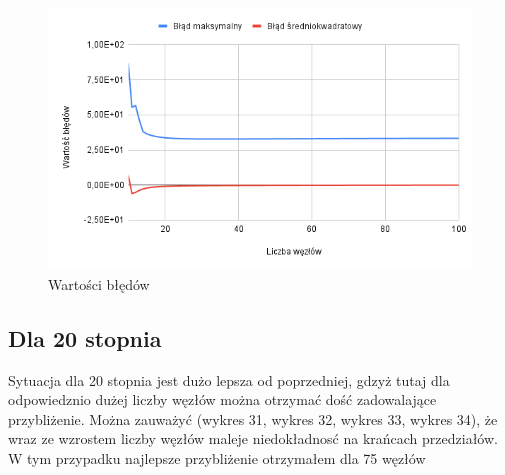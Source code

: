 \documentclass{article}
\begin{document}
\begin{figure}[H]
  \centering
  \begin{minipage}[b]{0.4\textwidth}
    \includegraphics[width=\textwidth]{img32.png}
    \caption{Wartości błędów}
  \end{minipage}
\end{figure}

\subsection{Dla 20 stopnia}

Sytuacja dla 20 stopnia jest dużo lepsza od poprzedniej, gdzyż tutaj dla odpowiedznio dużej liczby węzłów można otrzymać dość zadowalające przybliżenie. Można zauważyć (wykres 31, wykres 32, wykres 33, wykres 34), że wraz ze wzrostem liczby węzłów maleje niedokładnosć na krańcach przedziałów. W tym przypadku najlepsze przybliżenie otrzymałem dla 75 węzłów
\end{document}
